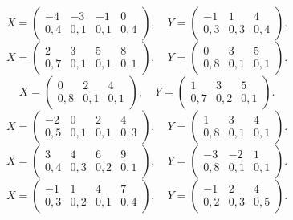 $$ X = \left(\begin{array}{*{4}{c}} -4 & -3 & -1 & 0 \\ 0{,}4 & 0{,}1 & 0{,}1 & 0{,}4 \end{array}\right), \quad Y = \left(\begin{array}{*{3}{c}} -1 & 1 & 4 \\ 0{,}3 & 0{,}3 & 0{,}4 \end{array}\right). $$
$$ X = \left(\begin{array}{*{4}{c}} 2 & 3 & 5 & 8 \\ 0{,}7 & 0{,}1 & 0{,}1 & 0{,}1 \end{array}\right), \quad Y = \left(\begin{array}{*{3}{c}} 0 & 3 & 5 \\ 0{,}8 & 0{,}1 & 0{,}1 \end{array}\right). $$
$$ X = \left(\begin{array}{*{3}{c}} 0 & 2 & 4 \\ 0{,}8 & 0{,}1 & 0{,}1 \end{array}\right), \quad Y = \left(\begin{array}{*{3}{c}} 1 & 3 & 5 \\ 0{,}7 & 0{,}2 & 0{,}1 \end{array}\right). $$
$$ X = \left(\begin{array}{*{4}{c}} -2 & 0 & 2 & 4 \\ 0{,}5 & 0{,}1 & 0{,}1 & 0{,}3 \end{array}\right), \quad Y = \left(\begin{array}{*{3}{c}} 1 & 3 & 4 \\ 0{,}8 & 0{,}1 & 0{,}1 \end{array}\right). $$
$$ X = \left(\begin{array}{*{4}{c}} 3 & 4 & 6 & 9 \\ 0{,}4 & 0{,}3 & 0{,}2 & 0{,}1 \end{array}\right), \quad Y = \left(\begin{array}{*{3}{c}} -3 & -2 & 1 \\ 0{,}8 & 0{,}1 & 0{,}1 \end{array}\right). $$
$$ X = \left(\begin{array}{*{4}{c}} -1 & 1 & 4 & 7 \\ 0{,}3 & 0{,}2 & 0{,}1 & 0{,}4 \end{array}\right), \quad Y = \left(\begin{array}{*{3}{c}} -1 & 2 & 4 \\ 0{,}2 & 0{,}3 & 0{,}5 \end{array}\right). $$
